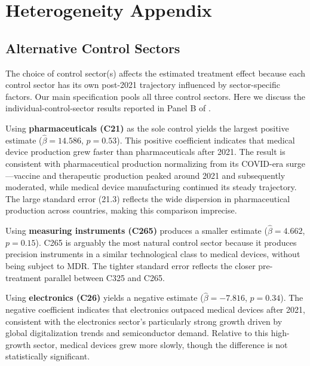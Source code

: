 \documentclass[12pt]{article}
\begin{document}

\section{Heterogeneity Appendix}
\label{app:heterogeneity}

\subsection{Alternative Control Sectors}

The choice of control sector(s) affects the estimated treatment effect because each control sector has its own post-2021 trajectory influenced by sector-specific factors. Our main specification pools all three control sectors. Here we discuss the individual-control-sector results reported in Panel B of .

Using \textbf{pharmaceuticals (C21)} as the sole control yields the largest positive estimate ($\hat{\beta} = 14.586$, $p = 0.53$). This positive coefficient indicates that medical device production grew faster than pharmaceuticals after 2021. The result is consistent with pharmaceutical production normalizing from its COVID-era surge---vaccine and therapeutic production peaked around 2021 and subsequently moderated, while medical device manufacturing continued its steady trajectory. The large standard error (21.3) reflects the wide dispersion in pharmaceutical production across countries, making this comparison imprecise.

Using \textbf{measuring instruments (C265)} produces a smaller estimate ($\hat{\beta} = 4.662$, $p = 0.15$). C265 is arguably the most natural control sector because it produces precision instruments in a similar technological class to medical devices, without being subject to MDR. The tighter standard error reflects the closer pre-treatment parallel between C325 and C265.

Using \textbf{electronics (C26)} yields a negative estimate ($\hat{\beta} = -7.816$, $p = 0.34$). The negative coefficient indicates that electronics outpaced medical devices after 2021, consistent with the electronics sector's particularly strong growth driven by global digitalization trends and semiconductor demand. Relative to this high-growth sector, medical devices grew more slowly, though the difference is not statistically significant.
\end{document}
